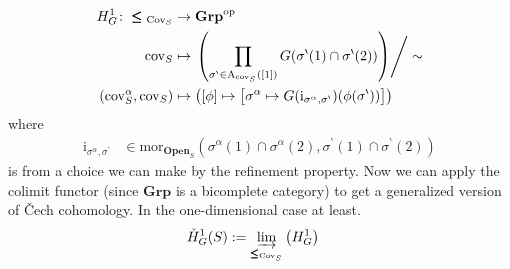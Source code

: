 \begin{exa}
\begin{align*}
  H_{G}^{1}
  \colon
  \pmb{\leq}_{\mathrm{Cov}_{S}}
  &\rightarrow
  \mathbf{Grp}^{\mathrm{op}}
  \\
  \mathrm{cov}_{S}
  &\mapsto
  \left.
    \left(
      \prod_{\sigma^{\backprime} \in \mathrm{A}_{\mathrm{cov}_{S}}([1])}
      G(\sigma^{\backprime}(1) \cap \sigma^{\backprime}(2))
    \right)
  \right\slash
  \sim
  \\
  \left(
    \mathrm{cov}_{S}^{\alpha},
    \mathrm{cov}_{S}
  \right)
  &\mapsto
  \left(
    [\phi]
    \mapsto
    \left[
      \sigma^{\alpha}
      \mapsto
      G(\mathrm{i}_{\sigma^{\alpha},\sigma^{\backprime}})
      (\phi(\sigma^{\backprime}))
    \right]
  \right)
\end{align*}
where
\begin{align*}
  \mathrm{i}_{\sigma^{\alpha},\sigma^{\backprime}}
  &\in
  \mathrm{mor}_{\mathbf{Open}_{S}}
  \left(
    \sigma^{\alpha}(1)
    \cap
    \sigma^{\alpha}(2),
    \sigma^{\backprime}(1)
    \cap
    \sigma^{\backprime}(2)
  \right)
\end{align*}
is from a choice we can make by the refinement property. Now we can apply the colimit functor (since $\mathbf{Grp}$ is a bicomplete category) to get a generalized version of \v{C}ech cohomology. In the one-dimensional case at least. 
\begin{align*}
  \check{H}_{G}^{1}(S)
  &:=
  \varinjlim_{\pmb{\leq}_{\mathrm{Cov}_{S}}}
  \left(
    H_{G}^{1}
  \right)
\end{align*}

\end{exa}
